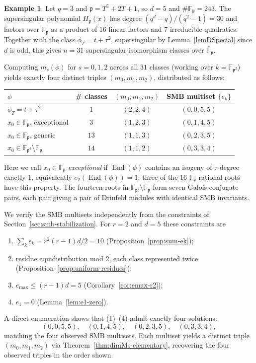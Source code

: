 \documentclass[12pt]{amsart}
\theoremstyle{definition}
\newtheorem{example}[thm]{Example}
\theoremstyle{remark}
\numberwithin{equation}{section}
\numberwithin{thm}{section}
\DeclareMathOperator{\End}{End}
\newcommand{\fp}{\mathfrak{p}}
\newcommand{\F}{\mathbb{F}}
\newcommand{\oF}{\overline{\F}}
\begin{document}
\begin{example}\label{ex:d5}
	Let $q = 3$ and $\fp = T^5 + 2T + 1$, so $d = 5$ and $\#\F_\fp = 243$. The supersingular polynomial $H_\fp(x)$ has degree $(q^d - q)/(q^2 - 1) = 30$ and factors over $\F_\fp$ as a product of $16$ linear factors and $7$ irreducible quadratics. Together with the class $\phi_T = t + \tau^2$, supersingular by Lemma~\ref{lemDSpecial} since $d$ is odd, this gives $n = 31$ supersingular isomorphism classes over $\oF_\fp$.
	
	Computing $m_s(\phi)$ for $s = 0,1,2$ across all $31$ classes (working over $k = \F_{\fp^2}$) yields exactly four distinct triples $(m_0,m_1,m_2)$, distributed as follows:
	\begin{center}
		\begin{tabular}{lccc}
			\hline
			$\phi$ & \# classes & $(m_0,m_1,m_2)$ & SMB multiset $\{e_k\}$ \\
			\hline
			$\phi_T = t + \tau^2$ & $1$ & $(2,2,4)$ & $(0,0,5,5)$ \\
			$x_0 \in \F_\fp$, exceptional & $3$ & $(1,2,3)$ & $(0,1,4,5)$ \\
			$x_0 \in \F_\fp$, generic & $13$ & $(1,1,3)$ & $(0,2,3,5)$ \\
			$x_0 \in \F_{\fp^2}\setminus\F_\fp$ & $14$ & $(1,1,2)$ & $(0,3,3,4)$ \\
			\hline
		\end{tabular}
	\end{center}
	Here we call $x_0 \in \F_\fp$ \emph{exceptional} if $\End(\phi)$ contains an isogeny of $\tau$-degree exactly $1$, equivalently $e_2(\End(\phi)) = 1$; three of the $16$ $\F_\fp$-rational roots have this property. The fourteen roots in $\F_{\fp^2}\setminus\F_\fp$ form seven Galois-conjugate pairs, each pair giving a pair of Drinfeld modules with identical SMB invariants.
	
	We verify the SMB multisets independently from the constraints of Section~\ref{sec:smb-stabilization}. For $r = 2$ and $d = 5$ these constraints are
	\begin{enumerate}
		\item[(1)] $\sum_k e_k = r^2(r-1)d/2 = 10$ (Proposition~\ref{prop:sum-ek});
		\item[(2)] residue equidistribution mod $2$, each class represented twice (Proposition~\ref{prop:uniform-residues});
		\item[(3)] $e_{\max} \leq (r-1)d = 5$ (Corollary~\ref{cor:emax-r2});
		\item[(4)] $e_1 = 0$ (Lemma~\ref{lem:e1-zero}).
	\end{enumerate}
	A direct enumeration shows that (1)--(4) admit exactly four solutions:
	\[
	(0,0,5,5), \quad (0,1,4,5), \quad (0,2,3,5), \quad (0,3,3,4),
	\]
	matching the four observed SMB multisets. Each multiset yields a distinct triple $(m_0,m_1,m_2)$ via Theorem~\ref{thm:dimMs-elementary}, recovering the four observed triples in the order shown.
	

\end{example}
\end{document}
